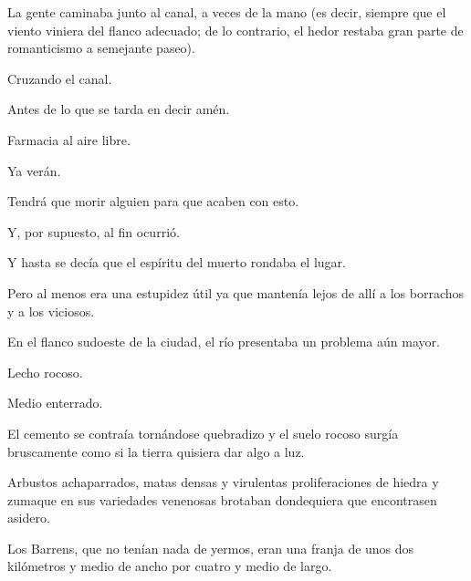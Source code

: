 \sk
La gente caminaba
junto al canal, a veces de la mano (es decir,
siempre que el viento viniera del flanco adecuado;
de lo contrario, el hedor restaba gran parte de
romanticismo a semejante paseo).

\sk
Cruzando el canal. 

\sk
Antes de lo que se tarda
en decir amén. \nb{}

\sk
Farmacia al aire libre. 

\sk
Ya verán. 

\sk
Tendrá que morir alguien para que acaben con
esto.

\sk
Y, por supuesto, al fin ocurrió.

\sk
Y hasta se decía que el espíritu del
muerto rondaba el lugar.

\sk
Pero al menos era una estupidez útil
ya que mantenía lejos de allí a los borrachos y a
los viciosos.
\nb{}

\sk
En el flanco sudoeste de la ciudad, el río
presentaba un problema aún mayor.

\sk
Lecho rocoso. 

\sk
Medio enterrado. 

\sk
El cemento se contraía
tornándose quebradizo y el suelo rocoso surgía
bruscamente como si la tierra quisiera dar algo a
luz.

\sk
Arbustos achaparrados,
matas densas y virulentas proliferaciones de
hiedra y zumaque en sus variedades venenosas
brotaban dondequiera que encontrasen asidero.

\sk
Los Barrens, que
no tenían nada de yermos, eran una franja de unos
dos kilómetros y medio de ancho por cuatro y
medio de largo.

